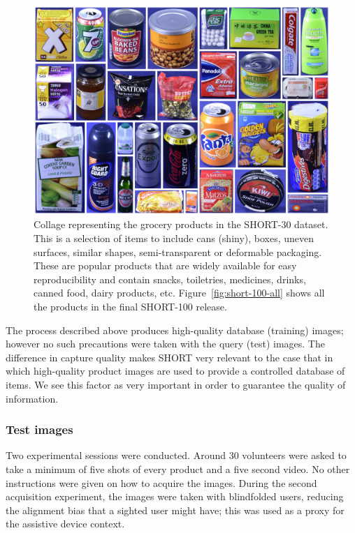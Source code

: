 \begin{figure}[]
\centering
\includegraphics[width=\textwidth]{./gfx/Chapter03/icip-all-products.jpg}
\caption{Collage representing the grocery products in the SHORT-30 dataset. This is a selection of items to include cans (shiny), boxes, uneven surfaces, similar shapes, semi-transparent or deformable packaging. These are popular products that are widely available for easy reproducibility and contain snacks, toiletries, medicines, drinks, canned food, dairy products, etc. Figure~\ref{fig:short-100-all} shows all the products in the final SHORT-100 release.}
\label{fig:collage-all}
\end{figure}


The process described above produces high-quality database (training) images; however no such precautions were taken with the query (test) images. The difference in capture quality makes SHORT very relevant to the case that in which high-quality product images are used to provide a controlled database of items.  We see this factor as very important in order to guarantee the quality of information.

\subsubsection{Test images}

Two experimental sessions were conducted. Around 30 volunteers were asked to take a minimum of five shots of every product and a five second video. No other instructions were given on how to acquire the images. During the second acquisition experiment, the images were taken with blindfolded users, reducing the alignment bias that a sighted user might have; this was used as a proxy for the assistive device context.  

